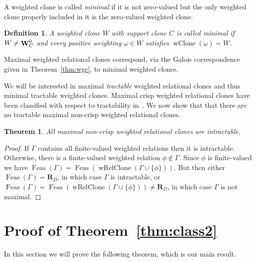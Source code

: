 \documentclass[11pt, reqno]{article}
\DeclareMathOperator{\wops}{{\bf W}}
\DeclareMathOperator{\feas}{Feas}
\DeclareMathOperator{\wclone}{wClone}
\DeclareMathOperator{\wrelclone}{wRelClone}
\newtheorem{theorem}{Theorem}%
\newtheorem{definition}{Definition}
\theoremstyle{remark}
\begin{document}
A weighted clone is called \emph{minimal} if it is not zero-valued but the only
weighted clone properly included in it is the zero-valued weighted clone. 

\begin{definition}
A weighted clone $W$ with support clone $C$ is called \emph{minimal} if
$W\neq\wops_C^0$ and every positive weighting $\omega\in W$ satisfies
$\wclone(\omega)=W$.
\end{definition}

Maximal weighted relational clones correspond, via the Galois correspondence
given in Theorem~\ref{thm:wgc}, to minimal weighted clones. 

We will be interested in maximal \emph{tractable} weighted relational clones and
thus minimal tractable weighted clones.
%
Maximal crisp weighted relational clones have been classified with respect to
tractability in~\cite{Bulatov01:complexity,Bulatov04:graph}.
%
We now show that that there are no tractable maximal non-crisp weighted
relational clones.

\begin{theorem}
All maximal non-crisp weighted relational clones are intractable.
\end{theorem}

\begin{proof}
%
If $\Gamma$ contains all finite-valued weighted relations then it is
intractable. Otherwise, there is a finite-valued weighted relation
$\phi\not\in\Gamma$. 
%
Since $\phi$ is finite-valued we have $\feas(\Gamma)=\feas(\wrelclone(\Gamma\cup\{\phi\}))$. But then either
$\feas(\Gamma)=\mathbf{R}_D$, in which case $\Gamma$ is intractable, or
$\feas(\Gamma)=\feas(\wrelclone(\Gamma\cup\{\phi\}))\neq\mathbf{R}_D$, in which
case $\Gamma$ is not maximal.
%
\end{proof}

\section{Proof of Theorem~\ref{thm:class2}}\label{sec:proof}

In this section we will prove the following theorem, which is our main result.
\end{document}
